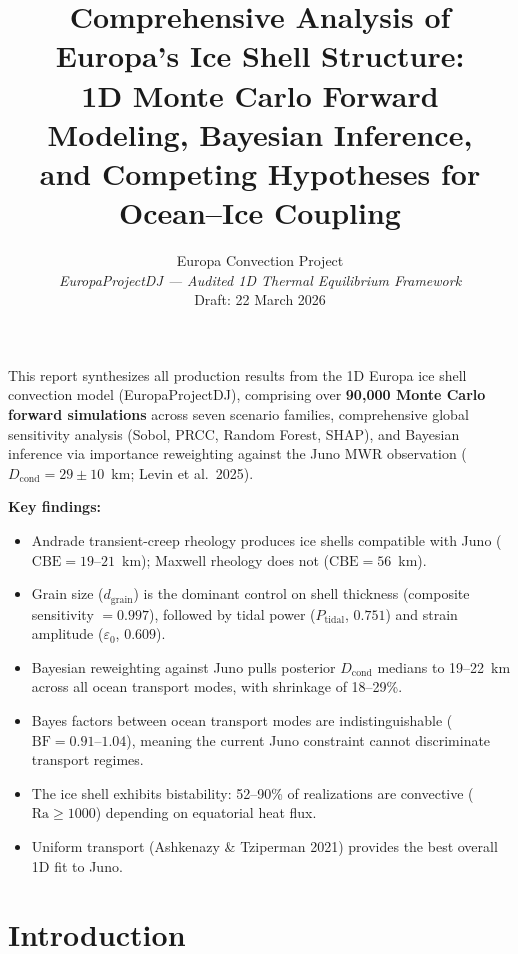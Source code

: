 \documentclass[11pt,letterpaper]{article}
\title{%
  \textbf{Comprehensive Analysis of Europa's Ice Shell Structure:\\
  1D Monte Carlo Forward Modeling, Bayesian Inference,\\
  and Competing Hypotheses for Ocean--Ice Coupling}
}
\author{%
  Europa Convection Project\\[4pt]
  \small \textit{EuropaProjectDJ --- Audited 1D Thermal Equilibrium Framework}\\[4pt]
  \small Draft: 22 March 2026
}
\date{}
\begin{document}
\maketitle
\thispagestyle{fancy}

\begin{summarybox}
This report synthesizes all production results from the 1D Europa ice shell convection model (EuropaProjectDJ), comprising over \textbf{90,000 Monte Carlo forward simulations} across seven scenario families, comprehensive global sensitivity analysis (Sobol, PRCC, Random Forest, SHAP), and Bayesian inference via importance reweighting against the Juno MWR observation ($D_\mathrm{cond} = 29 \pm 10$~km; Levin et al.\ 2025).

\textbf{Key findings:}
\begin{itemize}[nosep]
  \item Andrade transient-creep rheology produces ice shells compatible with Juno ($\mathrm{CBE} = 19$--$21$~km); Maxwell rheology does not ($\mathrm{CBE} = 56$~km).
  \item Grain size ($d_\mathrm{grain}$) is the dominant control on shell thickness (composite sensitivity $= 0.997$), followed by tidal power ($P_\mathrm{tidal}$, $0.751$) and strain amplitude ($\varepsilon_0$, $0.609$).
  \item Bayesian reweighting against Juno pulls posterior $D_\mathrm{cond}$ medians to 19--22~km across all ocean transport modes, with shrinkage of 18--29\%.
  \item Bayes factors between ocean transport modes are indistinguishable ($\mathrm{BF} = 0.91$--$1.04$), meaning the current Juno constraint cannot discriminate transport regimes.
  \item The ice shell exhibits bistability: 52--90\% of realizations are convective ($\mathrm{Ra} \geq 1000$) depending on equatorial heat flux.
  \item Uniform transport (Ashkenazy \& Tziperman 2021) provides the best overall 1D fit to Juno.
\end{itemize}
\end{summarybox}

\tableofcontents
\newpage

\section{Introduction}
\end{document}
